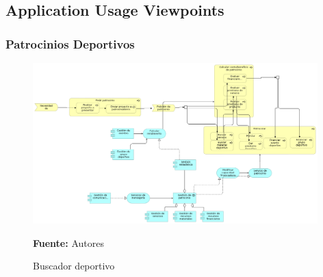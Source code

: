 \subsection{Application Usage Viewpoints}

\subsubsection{Patrocinios Deportivos}

\begin{figure}[!htb]
  \begin{center}
    \includegraphics[width=11cm]{./imagenes/application_usage/patrociniosdeportivos.png}
    \caption{Buscador deportivo}
    \label{fig:BF_BuscadorDeportivo}
    \textbf{Fuente:}  Autores
  \end{center}
\end{figure}

